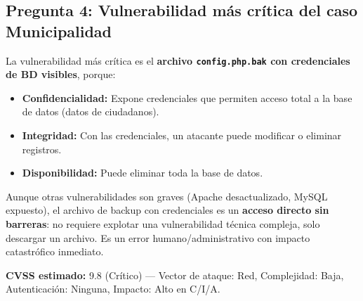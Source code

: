 \documentclass[11pt,a4paper]{article}
\begin{document}
\subsection*{Pregunta 4: Vulnerabilidad más crítica del caso Municipalidad}
\begin{respuesta}
La vulnerabilidad más crítica es el \textbf{archivo \texttt{config.php.bak} con credenciales de BD visibles}, porque:

\begin{itemize}[leftmargin=*]
  \item \textbf{Confidencialidad:} Expone credenciales que permiten acceso total a la base de datos (datos de ciudadanos).
  \item \textbf{Integridad:} Con las credenciales, un atacante puede modificar o eliminar registros.
  \item \textbf{Disponibilidad:} Puede eliminar toda la base de datos.
\end{itemize}

Aunque otras vulnerabilidades son graves (Apache desactualizado, MySQL expuesto), el archivo de backup con credenciales es un \textbf{acceso directo sin barreras}: no requiere explotar una vulnerabilidad técnica compleja, solo descargar un archivo. Es un error humano/administrativo con impacto catastrófico inmediato.

\textbf{CVSS estimado:} 9.8 (Crítico) --- Vector de ataque: Red, Complejidad: Baja, Autenticación: Ninguna, Impacto: Alto en C/I/A.
\end{respuesta}
\end{document}
